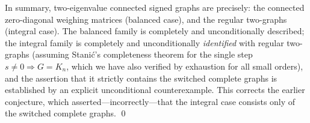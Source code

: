 \documentclass{amsart}
\theoremstyle{definition}
\begin{document}
In summary, two-eigenvalue connected signed graphs are precisely: the
connected zero-diagonal weighing matrices (balanced case), and the regular
two-graphs (integral case). The balanced family is completely and
unconditionally described; the integral family is completely and
unconditionally \emph{identified} with regular two-graphs (assuming Stani\'c's
completeness theorem for the single step $s\ne0\Rightarrow G=K_n$, which we
have also verified by exhaustion for all small orders), and the assertion that
it strictly contains the switched complete graphs is established by an explicit
unconditional counterexample. This corrects the earlier conjecture, which
asserted---incorrectly---that the integral case consists only of the switched
complete graphs.
\qed
\end{document}
